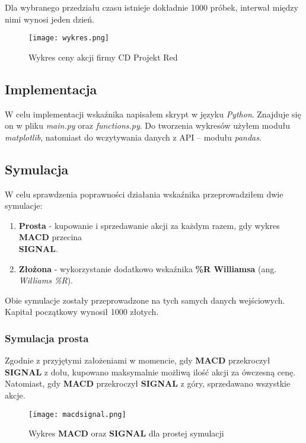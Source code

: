 \documentclass{article}
\begin{document}
    Dla wybranego przedziału czasu istnieje dokładnie 1000 próbek, interwał między nimi wynosi jeden dzień.
    \begin{figure}[H]
        \texttt{[image: wykres.png]}
        \centering
        \caption{Wykres ceny akcji firmy CD Projekt Red}
    \end{figure}

   
    \subsection{Implementacja}

    W celu implementacji wskaźnika napisałem skrypt w języku \textit{Python}.
    Znajduje się on w pliku \textit{main.py} oraz \textit{functions.py}. Do tworzenia wykresów
    użyłem modułu \textit{matplotlib}, natomiast do wczytywania danych z API -- modułu \textit{pandas}.
    \subsection{Symulacja}
    W celu sprawdzenia poprawności działania wskaźnika przeprowadziłem dwie symulacje:
    \begin{enumerate}
        \item \textbf{Prosta} - kupowanie i sprzedawanie akcji za każdym razem, gdy wykres \textbf{MACD} przecina \\ \textbf{SIGNAL}.
        \item \textbf{Złożona} - wykorzystanie dodatkowo wskaźnika \textbf{\%R Williamsa} (ang. \textit{Williams \%R}).
    \end{enumerate}
   
    Obie symulacje zostały przeprowadzone na tych samych danych wejściowych. Kapitał początkowy wynosił 1000 złotych. 

    \subsubsection{Symulacja prosta}

    Zgodnie z przyjętymi założeniami w momencie, gdy \textbf{MACD} przekroczył \textbf{SIGNAL} z dołu, kupowano maksymalnie możliwą ilość akcji 
    za ówczesną cenę.
    Natomiast, gdy \textbf{MACD} przekroczył \textbf{SIGNAL} z góry, sprzedawano wszystkie akcje.
    
    \begin{figure}[H]
        \texttt{[image: macdsignal.png]}
        \centering
        \caption{Wykres \textbf{MACD} oraz \textbf{SIGNAL} dla prostej symulacji}
    \end{figure}
\end{document}
